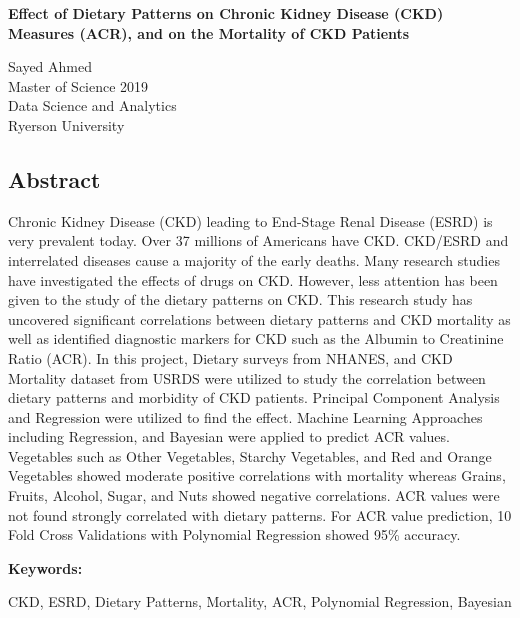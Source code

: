 \begin{center} 
\textbf{Effect of Dietary Patterns on Chronic Kidney Disease (CKD) Measures (ACR), and on the Mortality of CKD Patients} 

Sayed Ahmed \\
Master of Science 2019 \\
Data Science and Analytics \\
Ryerson University \\

\end{center}
\begin{center} \section*{Abstract} \end{center}
Chronic Kidney Disease (CKD) leading to End-Stage Renal Disease (ESRD) is very prevalent today. Over 37 millions of Americans have CKD. CKD/ESRD and interrelated diseases cause a majority of the early deaths.  Many research studies have investigated the effects of drugs on CKD. However, less attention has been given to the study of the dietary patterns on CKD. This research study has uncovered significant correlations between dietary patterns and CKD mortality as well as identified diagnostic markers for CKD such as the Albumin to Creatinine Ratio (ACR). In this project, Dietary surveys from NHANES, and CKD Mortality dataset from USRDS were utilized to study the correlation between dietary patterns and morbidity of CKD patients. Principal Component Analysis and Regression were utilized to find the effect. Machine Learning Approaches including Regression, and Bayesian were applied to predict ACR values. Vegetables such as Other Vegetables, Starchy Vegetables, and Red and Orange Vegetables showed moderate positive correlations with mortality whereas Grains, Fruits, Alcohol, Sugar, and Nuts showed negative correlations. ACR values were not found strongly correlated with dietary patterns. For ACR value prediction, 10 Fold Cross Validations with Polynomial Regression showed 95\% accuracy.

\medskip
\noindent \textbf{Keywords:} 

\noindent CKD, ESRD, Dietary Patterns, Mortality, ACR, Polynomial Regression, Bayesian